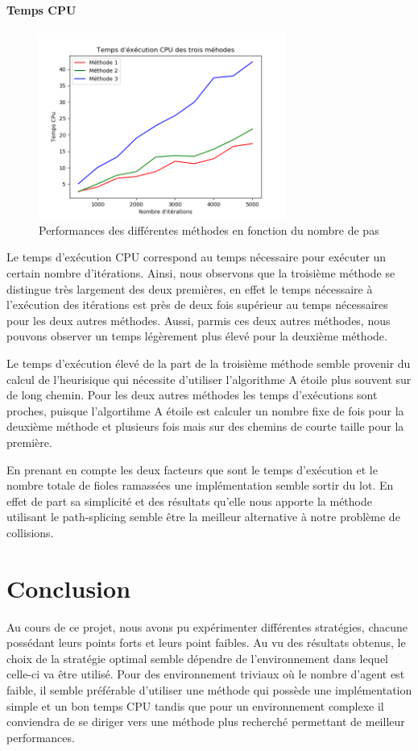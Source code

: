 \documentclass[a4paper, twocolumn]{article}
\begin{document}
		\subsection{Temps CPU}
		
		\begin{figure}[h!]
			\includegraphics[width=3.2in]{CPU_time.png}
			\caption{\textsf{Performances des différentes méthodes en fonction du nombre de pas}}
			\label{fig_sim}
		\end{figure}
	
		Le temps d'exécution CPU correspond au temps nécessaire pour exécuter un certain nombre d'itérations. Ainsi, nous observons que la troisième méthode se distingue très largement des deux premières, en effet le temps nécessaire à l'exécution des itérations est près de deux fois supérieur au temps nécessaires pour les deux autres méthodes. Aussi, parmis ces deux autres méthodes, nous pouvons observer un temps légèrement plus élevé pour la deuxième méthode.
		
		Le temps d'exécution élevé de la part de la troisième méthode semble provenir du calcul de l'heurisique qui nécessite d'utiliser l'algorithme A étoile plus souvent sur de long chemin.
		Pour les deux autres méthodes les temps d'exécutions sont proches, puisque l'algortihme A étoile est calculer un nombre fixe de fois pour la deuxième méthode et plusieurs fois mais sur des chemins de courte taille pour la première.
	 
	 	En prenant en compte les deux facteurs que sont le temps d'exécution et le nombre totale de fioles ramassées une implémentation semble sortir du lot. En effet de part sa simplicité et des résultats qu'elle nous apporte la méthode utilisant le path-splicing semble être la meilleur alternative à notre problème de collisions.
		
	\part{Conclusion}
	Au cours de ce projet, nous avons pu expérimenter différentes stratégies, chacune possédant leurs points forts et leurs point faibles. Au vu des résultats obtenus, le choix de la stratégie optimal semble dépendre de l'environnement dans lequel celle-ci va être utilisé. Pour des environnement triviaux où le nombre d'agent est faible, il semble préférable d'utiliser une méthode qui possède une implémentation simple et un bon temps CPU tandis que pour un environnement complexe il conviendra de se diriger vers une méthode plus recherché permettant de meilleur performances.
\end{document}
